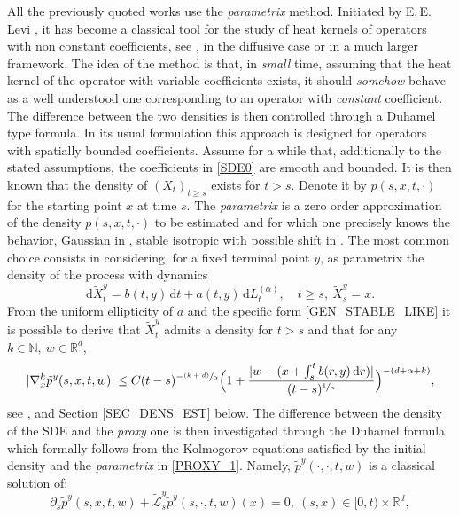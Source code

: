 \documentclass[JEP,XML,SOM,Unicode,published]{cedram}
\newcommand{\psfrac}[2]{\sfrac{(#1)}{#2}}
\newcommand{\rd}{\mathrm{d}}
\theoremstyle{plain}
\theoremstyle{definition}
\let\p\partial
\newcommand\mN{\mathbb{N}}
\newcommand\mR{\mathbb{R}}
\newcommand\1{{\mathbf{1}}}
\newcommand\sL{{\mathscr L}}
\newcommand{\dif}{\,\mathrm{d}}
\begin{document}
{All the previously quoted works use the \textit{parametrix} method. Initiated by E.\,E.\,Levi \cite{levi:07}, it has become a classical tool for the study of heat kernels of operators with non constant coefficients, see \eg \cite{Friedman}, \cite{mcke:sing:67} in the diffusive case or {\cite{koch:89} in a much larger framework}. The idea of the method is that, in \textit{small} time, assuming that the heat kernel of the operator with variable coefficients exists, it should \textit{somehow} behave as a well understood one corresponding to an operator with \textit{constant} coefficient. The difference between the two densities is then controlled through a Duhamel type formula.
In its usual formulation this approach is designed for operators with spatially bounded coefficients. Assume for a while that, additionally to the stated assumptions, the coefficients in \eqref{SDE0} are smooth and bounded. It is then known that the density of $(X_t)_{t\ge s}$ exists for $t>s$. Denote it by $p(s,x,t,\cdot)$ for the starting point $x$ at time $s$. The \textit{parametrix} is a zero order approximation of the density $p(s,x,t,\cdot) $ to be estimated and for which one precisely knows the behavior, \eg Gaussian in \cite{Friedman}, stable isotropic with possible shift in \cite{kolo:00}. The most common choice consists in considering, for a fixed terminal point $y$, as parametrix the density of the process with dynamics
\begin{equation}\label{PROXY_1}
\rd \tilde X_t^y=b(t,y)\dif t+a(t,y)\dif L^{(\alpha)}_t,\quad t\ge s,\ \tilde X_s^y=x.
\end{equation}
From the uniform ellipticity of $a$ and the specific form \eqref{GEN_STABLE_LIKE} it is possible to derive that
$ \tilde X_t^y$ admits a density for $t>s$ and that for any $k\in \mN,\ w\in \mR^d$,
\begin{align}\label{GRAD_BD_INTRO}
|\nabla_x^k \tilde p^y(s,x,t,w)|\le C (t-s)^{-\psfrac{k+d}\alpha}\Bigl(1+\frac{|w-(x+\int_s^t b(r,y)\dif r )|}{(t-s)^{\sfrac 1\alpha}}\Bigr)^{-(d+\alpha+k)},
\end{align}
see \eg \cite{Be}, \cite{Bo-Ja} and Section \ref{SEC_DENS_EST} below. The difference between the density of the SDE and the \textit{proxy} one is then investigated through the Duhamel formula which formally follows from the Kolmogorov equations satisfied by the initial density and the \textit{parametrix} in \eqref{PROXY_1}. Namely, $\tilde p^y(\cdot,\cdot,t,w) $ is a classical solution of:
\begin{equation}\label{KOLMO_FREEZE_INTRO}
\p_s \tilde p^{y}(s,x,t,w)+{\tilde \sL}^{y}_s{\tilde p}^{y}(s,\cdot,t,w)(x)=0,\ (s,x)\in [0,t)\times \mR^d,

\end{equation}}
\end{document}

